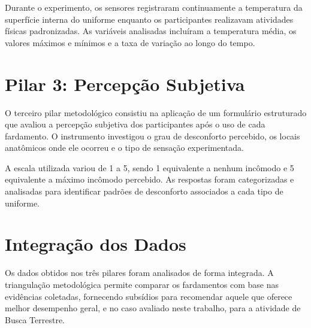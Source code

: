 Durante o experimento, os sensores registraram continuamente a temperatura da superfície 
interna do uniforme enquanto os participantes realizavam atividades físicas padronizadas. As variáveis 
analisadas incluíram a temperatura média, os valores máximos e mínimos e a taxa de variação ao longo 
do tempo.

\section{Pilar 3: Percepção Subjetiva}

O terceiro pilar metodológico consistiu na aplicação de um formulário estruturado que avaliou a 
percepção subjetiva dos participantes após o uso de cada fardamento. O instrumento investigou o grau 
de desconforto percebido, os locais anatômicos onde ele ocorreu e o tipo de sensação experimentada.

A escala utilizada variou de 1 a 5, sendo 1 equivalente a nenhum incômodo e 5 equivalente a máximo 
incômodo percebido. As respostas foram categorizadas e analisadas para identificar padrões de 
desconforto associados a cada tipo de uniforme.

\section{Integração dos Dados}

Os dados obtidos nos três pilares foram analisados de forma integrada. A triangulação metodológica 
permite comparar os fardamentos com base nas evidências coletadas, fornecendo subsídios 
para recomendar aquele que oferece melhor desempenho geral, e no caso avaliado neste trabalho, 
para a atividade de Busca Terrestre.
